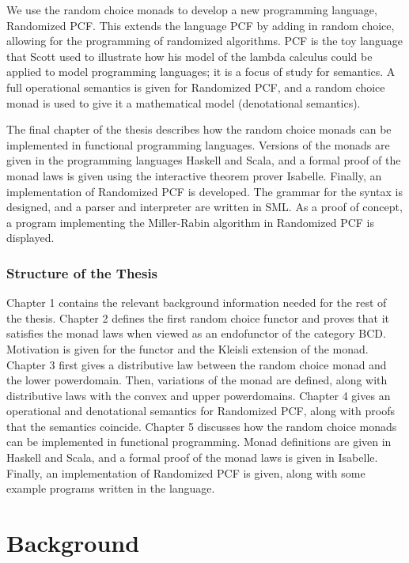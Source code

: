 We use the random choice monads to develop a new programming language, Randomized PCF.  This extends the language PCF by adding in random choice, allowing for the programming of randomized algorithms.  PCF is the toy language that Scott used to illustrate how his model of the lambda calculus could be applied to model programming languages; it is a focus of study for semantics.  A full operational semantics is given for Randomized PCF, and a random choice monad is used to give it a mathematical model (denotational semantics).

The final chapter of the thesis describes how the random choice monads can be implemented in functional programming languages.  Versions of the monads are given in the programming languages Haskell and Scala, and a formal proof of the monad laws is given using the interactive theorem prover Isabelle.  Finally, an implementation of Randomized PCF is developed.  The grammar for the syntax is designed, and a parser and interpreter are written in SML.  As a proof of concept, a program implementing the Miller-Rabin algorithm in Randomized PCF is displayed.

\subsubsection{Structure of the Thesis}

Chapter 1 contains the relevant background information needed for the rest of the thesis.  Chapter 2 defines the first random choice functor and proves that it satisfies the monad laws when viewed as an endofunctor of the category \textsf{BCD}.  Motivation is given for the functor and the Kleisli extension of the monad.  Chapter 3 first gives a distributive law between the random choice monad and the lower powerdomain.  Then, variations of the monad are defined, along with distributive laws with the convex and upper powerdomains.  Chapter 4 gives an operational and denotational semantics for Randomized PCF, along with proofs that the semantics coincide.  Chapter 5 discusses how the random choice monads can be implemented in functional programming.  Monad definitions are given in Haskell and Scala, and a formal proof of the monad laws is given in Isabelle.  Finally, an implementation of Randomized PCF is given, along with some example programs written in the language.

\section{Background}

